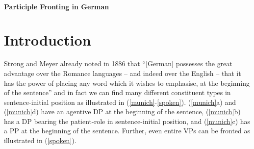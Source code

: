 \documentclass[letterpaper,parskip=half]{scrartcl}
\begin{document}
\thispagestyle{scrheadings}
 
~

\vspace{-2ex}

\begin{center}
\huge \textsf{\textbf{Participle Fronting in German}}


\end{center}

\vspace{1ex}



\section{Introduction}

Strong and Meyer already noted in 1886 that ``[German] possesses the great advantage over the Romance languages -- and indeed over the English -- that it has the power of placing any word which it wishes to emphasise, at the beginning of the sentence'' \citep[p.32]{strong1886outlines} and in fact we
can find many different constituent types in sentence-initial position as illustrated in (\ref{munich}-\ref{spoken}). (\ref{munich}a) and (\ref{munich}d) 
have an agentive DP at the beginning of the sentence, (\ref{munich}b) has a DP bearing the patient-role in sentence-initial position, and (\ref{munich}c) has a PP at the beginning of the sentence. Further, even entire VPs can be fronted as illustrated in (\ref{spoken}).
\end{document}
